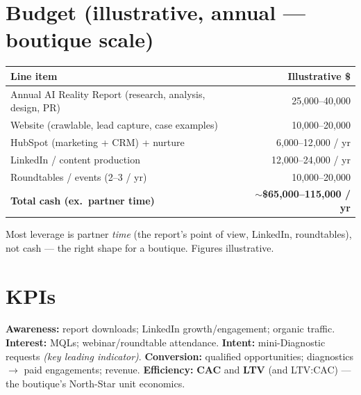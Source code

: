 \documentclass[11pt]{article}
\begin{document}
\section{Budget (illustrative, annual --- boutique scale)}
\begin{center}
\renewcommand{\arraystretch}{1.2}\small
\begin{tabular}{p{7.6cm} r}
\toprule
\textbf{Line item} & \textbf{Illustrative \$} \\
\midrule
Annual AI Reality Report (research, analysis, design, PR) & 25{,}000--40{,}000 \\
Website (crawlable, lead capture, case examples) & 10{,}000--20{,}000 \\
HubSpot (marketing + CRM) + nurture & 6{,}000--12{,}000 / yr \\
LinkedIn / content production & 12{,}000--24{,}000 / yr \\
Roundtables / events (2--3 / yr) & 10{,}000--20{,}000 \\
\midrule
\textbf{Total cash (ex.\ partner time)} & \textbf{$\sim$\$65{,}000--115{,}000 / yr} \\
\bottomrule
\end{tabular}
\end{center}
Most leverage is partner \emph{time} (the report's point of view, LinkedIn, roundtables), not
cash --- the right shape for a boutique. Figures illustrative.

\section{KPIs}
\textbf{Awareness:} report downloads; LinkedIn growth/engagement; organic traffic.
\textbf{Interest:} MQLs; webinar/roundtable attendance. \textbf{Intent:} mini-Diagnostic
requests \emph{(key leading indicator)}. \textbf{Conversion:} qualified opportunities;
diagnostics $\rightarrow$ paid engagements; revenue. \textbf{Efficiency:} \textbf{CAC} and
\textbf{LTV} (and LTV:CAC) --- the boutique's North-Star unit economics.

\end{document}
